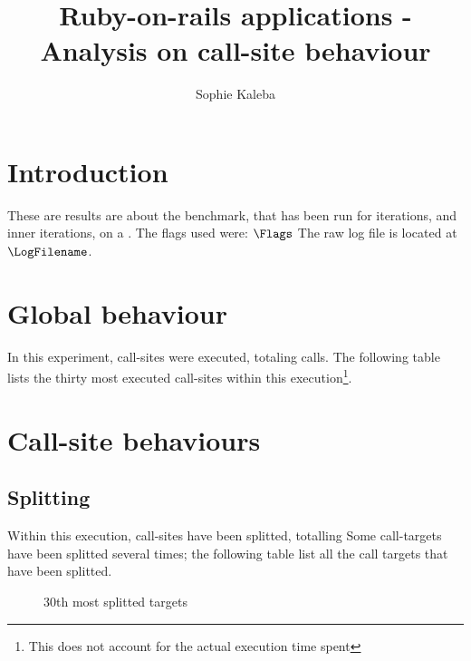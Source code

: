 \documentclass[preprint]{acmart}
\begin{document}
\title{Ruby-on-rails applications - Analysis on call-site behaviour}

\author{Sophie Kaleba}

\maketitle

\section{Introduction}

These are results are about the \BenchmarkName benchmark, that has been run for \NumIterations iterations, and \NumInnerIterations inner iterations, on a \Hihaho.
The flags used were: $\Flags$
The raw log file is located at $\LogFilename$. 

\section{Global behaviour}

In this experiment, \NumberCallSites call-sites were executed, totaling \NumberCalls calls.  
The following table lists the thirty most executed call-sites within this execution\footnote{This does not account for the actual execution time spent}.

\MostExecutedCallSite

\section{Call-site behaviours}

\subsection{Splitting}

Within this execution, \NumOfSplittedTargets call-sites have been splitted, totalling \NumsOfSplits
Some call-targets have been splitted several times; the following table list all the call targets that have been splitted.

\newpage

\begin{landscape}
\begin{figure}[h]
  \centering
  \Splitting
  \caption{
    30th most splitted targets}
\end{figure}
\end{landscape}
\end{document}
